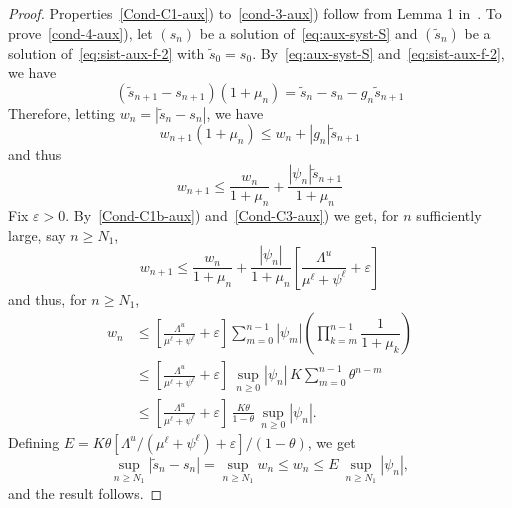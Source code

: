 \documentclass[reqno]{amsart}
\renewcommand{\le}{\leqslant}
\renewcommand{\ge}{\geqslant}
\newcommand{\eps}{\varepsilon}
\begin{document}
{{\begin{proof}
Properties~\ref{Cond-C1-aux}) to~\ref{cond-3-aux}) follow from Lemma 1 in~\cite{Mateus-IJDE-2016}. To prove~\ref{cond-4-aux}),
let $(s_n)$ be a solution of~\eqref{eq:aux-syst-S} and $(\tilde s_n)$ be a solution of~\eqref{eq:sist-aux-f-2} with $\tilde s_0=s_0$. By~\eqref{eq:aux-syst-S} and~\eqref{eq:sist-aux-f-2}, we have
\[
(\tilde s_{n+1}-s_{n+1})(1+\mu_n)=\tilde s_n-s_n-g_n \tilde s_{n+1}
\]
Therefore, letting $w_n=|\tilde s_n-s_n|$, we have
\[
w_{n+1}(1+\mu_n)\le w_n + |g_n| \tilde s_{n+1}
\]
and thus
\[
w_{n+1} \le \frac{w_n}{1+\mu_n} + \frac{|\psi_n|\tilde s_{n+1}}{1+\mu_n}
\]
Fix $\eps>0$. By~\ref{Cond-C1b-aux}) and~\ref{Cond-C3-aux}) we get, for $n$ sufficiently large, say $n \ge N_1$,
\[
w_{n+1} \le \frac{w_n}{1+\mu_n} + \frac{|\psi_n|}{1+\mu_n}\left[\frac{\Lambda^u}{\mu^\ell+\psi^\ell}+\eps\right]
\]
and thus, for $n \ge N_1$,
\[
\begin{split}
w_n
& \le  \left[\frac{\Lambda^u}{\mu^\ell+\psi^\ell}+\eps\right] \sum_{m=0}^{n-1} |\psi_m| \left(\prod_{k=m}^{n-1}\dfrac{1}{1+\mu_k}\right)\\
& \le  \left[ \frac{\Lambda^u}{\mu^\ell+\psi^\ell}+\eps \right]  \ \sup_{n \ge 0} |\psi_n| \, K \sum_{m=0}^{n-1} \theta^{n-m}\\
& \le  \left[ \frac{\Lambda^u}{\mu^\ell+\psi^\ell}+\eps \right] \, \frac{K\theta}{1-\theta} \, \sup_{n \ge 0}|\psi_n|.
\end{split}
\]
Defining $E= K\theta\left[\Lambda^u/(\mu^\ell+\psi^\ell)+\eps \right] /(1-\theta)$, we get
\[
\sup_{n \ge N_1} |\tilde s_n - s_n| = \sup_{n \ge N_1} w_n \le w_n \le E \ \sup_{n \ge N_1} |\psi_n|,
\]
and the result follows.
\end{proof}

}}
\end{document}
